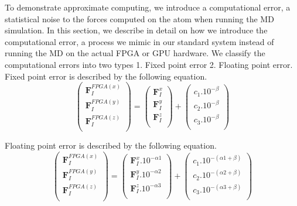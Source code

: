 To demonstrate approximate computing, we introduce a computational error, a statistical noise to the forces computed on the atom when running the MD simulation. In this section, we describe in detail on how we introduce the computational error, a process we mimic in our standard system instead of running the MD on the actual FPGA or GPU hardware. We classify the computational errors into two types 1. Fixed point error 2. Floating point error. 
Fixed point error is described by the following equation. 
\begin{equation}
\begin{pmatrix}
\textbf{F}_{I}^{FPGA(x)}\\ 
\textbf{F}_{I}^{FPGA(y)}\\ 
\textbf{F}_{I}^{FPGA(z)}\\ 

\end{pmatrix} = 
\begin{pmatrix}
\textbf{F}_{I}^{x}\\ 
\textbf{F}_{I}^{y}\\ 
\textbf{F}_{I}^{z}\\ 

\end{pmatrix} + 
\begin{pmatrix}
c_{1}.10^{-\beta }\\ 
c_{2}.10^{-\beta }\\ 
c_{3}.10^{-\beta }\\ 

\end{pmatrix}
\end{equation}
 
Floating point error is described by the following equation.
\begin{equation}
\begin{pmatrix}
\textbf{F}_{I}^{FPGA(x)}\\ 
\textbf{F}_{I}^{FPGA(y)}\\ 
\textbf{F}_{I}^{FPGA(z)}\\ 

\end{pmatrix} = 
\begin{pmatrix}
\textbf{F}_{I}^{x}.10^{-\alpha1}\\ 
\textbf{F}_{I}^{y}.10^{-\alpha2}\\ 
\textbf{F}_{I}^{z}.10^{-\alpha3}\\ 

\end{pmatrix} + 
\begin{pmatrix}
c_{1}.10^{-(\alpha1+\beta)}\\ 
c_{2}.10^{-(\alpha2+\beta)}\\ 
c_{3}.10^{-(\alpha3+\beta)}\\ 

\end{pmatrix}
\end{equation}

